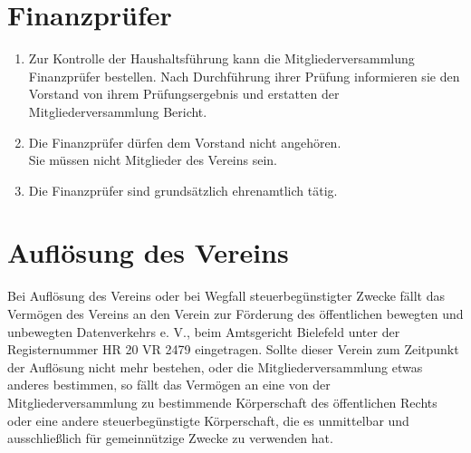 \documentclass[10pt,a4paper]{scrartcl}
\begin{document}
\section{Finanzprüfer}

\begin{enumerate}[label=(\arabic*)]
\item
  Zur Kontrolle der Haushaltsführung kann die Mitgliederversammlung Finanzprüfer
  bestellen. Nach Durchführung ihrer Prüfung informieren sie den Vorstand von ihrem
  Prüfungsergebnis und erstatten der Mitgliederversammlung Bericht.
\item
  Die Finanzprüfer dürfen dem Vorstand nicht angehören.\\
  Sie müssen nicht Mitglieder des Vereins sein.
\item
  Die Finanzprüfer sind grundsätzlich ehrenamtlich tätig.
\end{enumerate}


\section{Auflösung des Vereins}

Bei Auflösung des Vereins oder bei Wegfall steuerbegünstigter Zwecke fällt das
Vermögen des Vereins an den Verein zur Förderung des öffentlichen bewegten und
unbewegten Datenverkehrs e. V., beim Amtsgericht Bielefeld unter der
Registernummer HR 20 VR 2479 eingetragen. Sollte dieser Verein zum Zeitpunkt der
Auflösung nicht mehr bestehen, oder die Mitgliederversammlung etwas anderes
bestimmen, so fällt das Vermögen an eine von der Mitgliederversammlung zu
bestimmende Körperschaft des öffentlichen Rechts oder eine andere
steuerbegünstigte Körperschaft, die es unmittelbar und ausschließlich für
gemeinnützige Zwecke zu verwenden hat.
\end{document}
